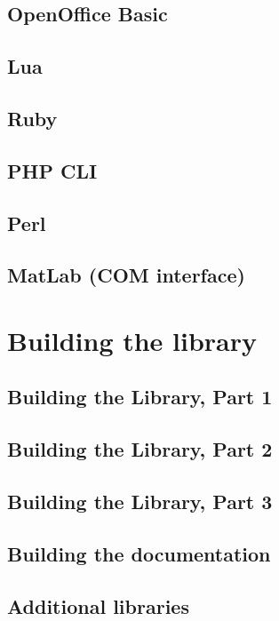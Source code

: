 \documentclass[12pt,a4paper,openany]{book}
\begin{document}
\section{OpenOffice Basic}

\section{Lua}

\section{Ruby}

\section{PHP CLI}

\section{Perl}

\section{MatLab (COM interface)}

\chapter{Building the library}

\section{Building the Library, Part 1}

\section{Building the Library, Part 2}

\section{Building the Library, Part 3}

\section{Building the documentation}

\section{Additional libraries}
\end{document}
